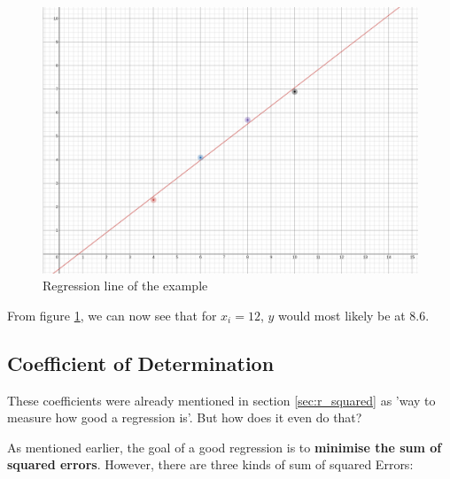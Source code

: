 \documentclass[11pt]{article}
\begin{document}
\begin{figure}[htb!]
    \centering
    \includegraphics[keepaspectratio=true, width=\linewidth]{regression_line.png}
    \caption{Regression line of the example}
    \label{fig:regression_line}
\end{figure}

From figure \ref{fig:regression_line}, we can now see that for $x_{i}=12$, $y$ would most likely be at $8.6$.

\subsection{Coefficient of Determination}

These coefficients were already mentioned in section \ref{sec:r_squared} as 'way to measure how good a regression is'. But how does it even do that?

As mentioned earlier, the goal of a good regression is to \textbf{minimise the sum of squared errors}. However, there are three kinds of sum of squared Errors:

\vspace{10px}
\end{document}
